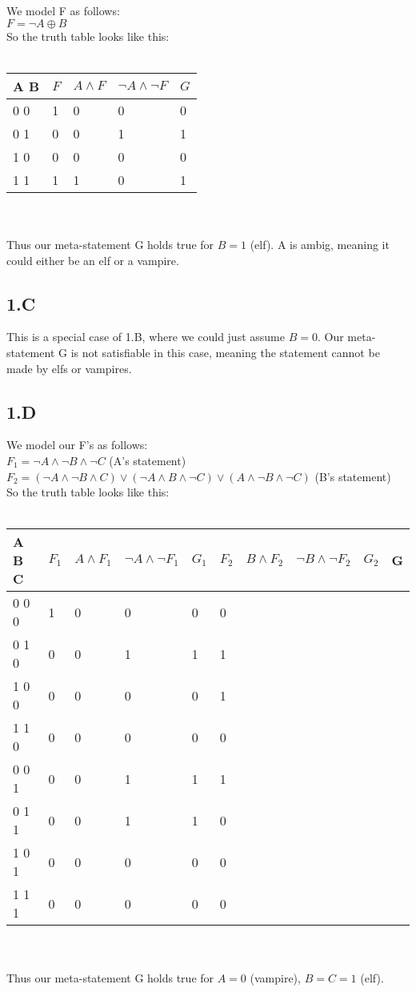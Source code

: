 \documentclass[12pt]{article}
\begin{document}
We model F as follows:\\
$F = \neg A \oplus B$ \\
So the truth table looks like this:\\\\
\begin{tabular}{  l | l | l | l | l}
	A B & $F$ & $A \land F $ & $\neg A \land \neg F$ & $G$ \\ \hline
	0 0 & 1 & 0 & 0 & 0 \\
	0 1 & 0 & 0 & 1 & 1 \\
	1 0 & 0 & 0 & 0 & 0 \\
	1 1 & 1 & 1 & 0 & 1 \\
\end{tabular} \\\\
Thus our meta-statement G holds true for $B=1$ (elf). A is ambig, meaning it could either be an elf or a vampire.

\subsection*{1.C}

This is a special case of 1.B, where we could just assume $B=0$. Our meta-statement G is not satisfiable in this case, meaning the statement cannot be made by elfs or vampires.

\subsection*{1.D}
We model our F's as follows:\\
$F_1 = \neg A \land \neg B \land \neg C$ (A's statement)\\	
$F_2 = (\neg A \land \neg B \land C) \lor (\neg A \land B \land \neg C) \lor (A \land \neg B \land \neg C)$ (B's statement)\\
So the truth table looks like this:\\\\
\begin{tabular}{  l | l | l | l | l | l | l | l | l | l}
	A B C & $F_1$ & $A \land F_1 $ & $\neg A \land \neg F_1$ & $G_1$ & $F_2$ & $B \land F_2 $ & $\neg B \land \neg F_2$ & $G_2$ & G\\ \hline
	0 0 0 & 1 & 0 & 0 & 0 & 0 &  &  &  &  \\
	0 1 0 & 0 & 0 & 1 & 1 & 1 &  &  &  &  \\
	1 0 0 & 0 & 0 & 0 & 0 & 1 &  &  &  &  \\
	1 1 0 & 0 & 0 & 0 & 0 & 0 &  &  &  &  \\
	0 0 1 & 0 & 0 & 1 & 1 & 1 &  &  &  &  \\
	0 1 1 & 0 & 0 & 1 & 1 & 0 &  &  &  &  \\
	1 0 1 & 0 & 0 & 0 & 0 & 0 &  &  &  &  \\
	1 1 1 & 0 & 0 & 0 & 0 & 0 &  &  &  &  \\
\end{tabular} \\\\
Thus our meta-statement G holds true for $A=0$ (vampire), $B=C=1$ (elf).
\end{document}
